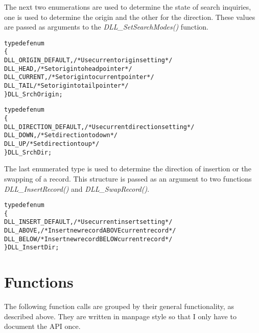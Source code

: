 \documentclass[10pt,letterpaper,titlepage]{article}
\begin{document}
\noindent
The next two enumerations are used to determine the state of search inquiries, one is used to determine the origin and the other for the direction.  These values are passed as arguments to the \emph{DLL\_SetSearchModes()} function.

\small
\begin{alltt}
typedef enum
   \{
   DLL_ORIGIN_DEFAULT,    /* Use current origin setting */
   DLL_HEAD,              /* Set origin to head pointer */
   DLL_CURRENT,           /* Set origin to current pointer */
   DLL_TAIL               /* Set origin to tail pointer */
   \} DLL_SrchOrigin;

typedef enum
   \{
   DLL_DIRECTION_DEFAULT, /* Use current direction setting */
   DLL_DOWN,              /* Set direction to down */
   DLL_UP                 /* Set direction to up */
   \} DLL_SrchDir;
\end{alltt}
\normalsize
\vspace{8pt}

\noindent
The last enumerated type is used to determine the direction of insertion or the swapping of a record.  This structure is passed as an argument to two functions \emph{DLL\_InsertRecord()} and \emph{DLL\_SwapRecord()}.

\small
\begin{alltt}
typedef enum
   \{
   DLL_INSERT_DEFAULT,    /* Use current insert setting */
   DLL_ABOVE,             /* Insert new record ABOVE current record */
   DLL_BELOW              /* Insert new record BELOW current record */
   \} DLL_InsertDir;
\end{alltt}
\normalsize
\pagebreak

\section{Functions}
The following function calls are grouped by their general functionality, as described above.  They are written in manpage style so that I only have to document the API once.
\end{document}
